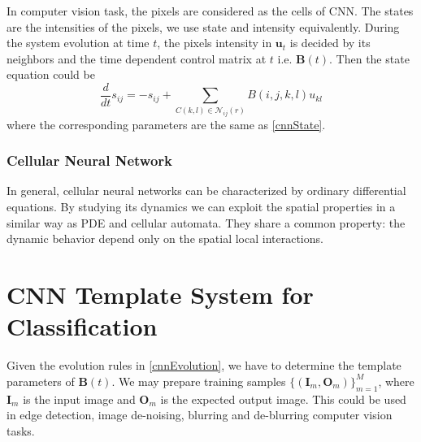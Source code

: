 \documentclass{amsart}
\theoremstyle{definition}
\theoremstyle{remark}
\numberwithin{equation}{section}
\begin{document}
In computer vision task, the pixels are considered as the cells of CNN. The states are the intensities of the pixels, we use state and intensity equivalently. During the system evolution at time $t$, the pixels intensity in $\mathbf{u}_t$ is decided by its neighbors and the time dependent control matrix at $t$ i.e. $\mathbf{B}(t)$.
Then the state equation could be 
\begin{equation}
\frac{d}{dt}s_{ij} = -s_{ij}  + \sum_{C(k,l) \in \mathcal{N}_{ij}(r)}B(i, j, k, l)u_{kl} 
\end{equation}
where the corresponding parameters are the same as \ref{cnnState}.

\subsubsection{Cellular Neural Network}
In general, cellular neural networks can be characterized by ordinary differential equations.
By studying its dynamics we can exploit the spatial properties in a similar way as PDE and cellular automata.
They share a common property: the dynamic behavior depend only on the spatial local interactions.

\section{CNN Template System for Classification}
Given the evolution rules in \ref{cnnEvolution}, we have to determine the template parameters of $\mathbf{B}(t)$.
We may prepare training samples $\{(\mathbf{I}_m, \mathbf{O}_m)\}_{m=1}^M$, where $\mathbf{I}_m$ is the input image and $\mathbf{O}_m$ is the expected output image. This could be used in edge detection, image de-noising,  blurring and de-blurring computer vision tasks.
\end{document}
